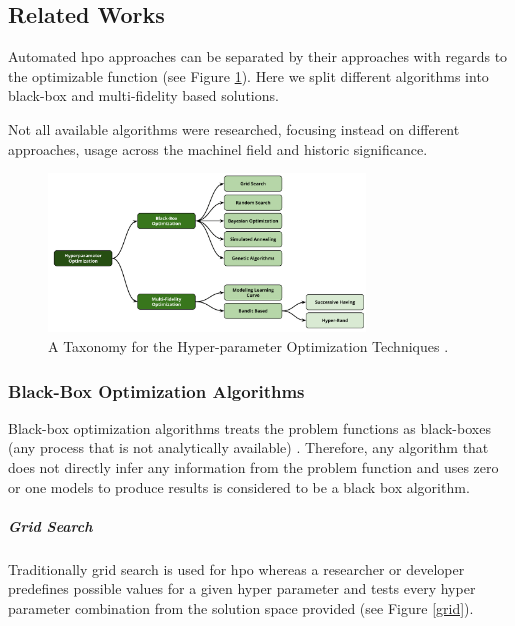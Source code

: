 
\subsection{Related Works}

Automated \acrshort{hpo} approaches can be separated by their approaches with regards to the optimizable function (see Figure \ref{fig:state_of_art_taxonomy}). Here we split different algorithms into black-box and multi-fidelity based solutions.

Not all available algorithms were researched, focusing instead on different approaches, usage across the \acrshort{machinel} field and historic significance.

\begin{figure}[h]
	\centering
	\includegraphics[width=0.75\textwidth]{images/state_art-taxonomy_optimizers.png}
	\caption{A Taxonomy for the Hyper-parameter Optimization Techniques \parencite{elshawi2019automated}.}
	\label{fig:state_of_art_taxonomy}
\end{figure}

\subsubsection{Black-Box Optimization Algorithms}

Black-box optimization algorithms treats the problem functions as black-boxes (any process that is not analytically available) \parencite[ch.~1]{book}. Therefore, any algorithm that does not directly infer any information from the problem function and uses zero or one models to produce results is considered to be a black box algorithm.

\subparagraph{Grid Search}
Traditionally grid search is used for \acrshort{hpo} \parencite{liashchynskyi2019grid} whereas a researcher or developer predefines possible values for a given hyper parameter and tests every hyper parameter combination from the solution space provided (see Figure \ref{grid}).

